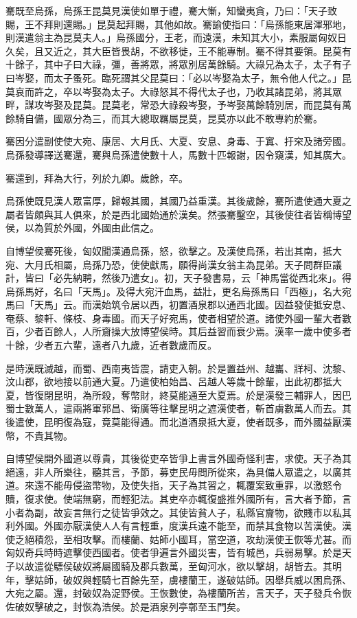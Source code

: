 \begin{pinyinscope}
騫既至烏孫，烏孫王昆莫見漢使如單于禮，騫大慚，知蠻夷貪，乃曰：「天子致賜，王不拜則還賜。」昆莫起拜賜，其他如故。騫諭使指曰：「烏孫能東居渾邪地，則漢遣翁主為昆莫夫人。」烏孫國分，王老，而遠漢，未知其大小，素服屬匈奴日久矣，且又近之，其大臣皆畏胡，不欲移徙，王不能專制。騫不得其要領。昆莫有十餘子，其中子曰大祿，彊，善將眾，將眾別居萬餘騎。大祿兄為太子，太子有子曰岑娶，而太子蚤死。臨死謂其父昆莫曰：「必以岑娶為太子，無令他人代之。」昆莫哀而許之，卒以岑娶為太子。大祿怒其不得代太子也，乃收其諸昆弟，將其眾畔，謀攻岑娶及昆莫。昆莫老，常恐大祿殺岑娶，予岑娶萬餘騎別居，而昆莫有萬餘騎自備，國眾分為三，而其大總取羈屬昆莫，昆莫亦以此不敢專約於騫。

騫因分遣副使使大宛、康居、大月氏、大夏、安息、身毒、于窴、扜穼及諸旁國。烏孫發導譯送騫還，騫與烏孫遣使數十人，馬數十匹報謝，因令窺漢，知其廣大。

騫還到，拜為大行，列於九卿。歲餘，卒。

烏孫使既見漢人眾富厚，歸報其國，其國乃益重漢。其後歲餘，騫所遣使通大夏之屬者皆頗與其人俱來，於是西北國始通於漢矣。然張騫鑿空，其後使往者皆稱博望侯，以為質於外國，外國由此信之。

自博望侯騫死後，匈奴聞漢通烏孫，怒，欲擊之。及漢使烏孫，若出其南，抵大宛、大月氏相屬，烏孫乃恐，使使獻馬，願得尚漢女翁主為昆弟。天子問群臣議計，皆曰「必先納聘，然後乃遣女」。初，天子發書易，云「神馬當從西北來」。得烏孫馬好，名曰「天馬」。及得大宛汗血馬，益壯，更名烏孫馬曰「西極」，名大宛馬曰「天馬」云。而漢始筑令居以西，初置酒泉郡以通西北國。因益發使抵安息、奄蔡、黎軒、條枝、身毒國。而天子好宛馬，使者相望於道。諸使外國一輩大者數百，少者百餘人，人所齎操大放博望侯時。其后益習而衰少焉。漢率一歲中使多者十餘，少者五六輩，遠者八九歲，近者數歲而反。

是時漢既滅越，而蜀、西南夷皆震，請吏入朝。於是置益州、越巂、牂柯、沈黎、汶山郡，欲地接以前通大夏。乃遣使柏始昌、呂越人等歲十餘輩，出此初郡抵大夏，皆復閉昆明，為所殺，奪幣財，終莫能通至大夏焉。於是漢發三輔罪人，因巴蜀士數萬人，遣兩將軍郭昌、衛廣等往擊昆明之遮漢使者，斬首虜數萬人而去。其後遣使，昆明復為寇，竟莫能得通。而北道酒泉抵大夏，使者既多，而外國益厭漢幣，不貴其物。

自博望侯開外國道以尊貴，其後從吏卒皆爭上書言外國奇怪利害，求使。天子為其絕遠，非人所樂往，聽其言，予節，募吏民毋問所從來，為具備人眾遣之，以廣其道。來還不能毋侵盜幣物，及使失指，天子為其習之，輒覆案致重罪，以激怒令贖，復求使。使端無窮，而輕犯法。其吏卒亦輒復盛推外國所有，言大者予節，言小者為副，故妄言無行之徒皆爭效之。其使皆貧人子，私縣官齎物，欲賤市以私其利外國。外國亦厭漢使人人有言輕重，度漢兵遠不能至，而禁其食物以苦漢使。漢使乏絕積怨，至相攻擊。而樓蘭、姑師小國耳，當空道，攻劫漢使王恢等尤甚。而匈奴奇兵時時遮擊使西國者。使者爭遍言外國災害，皆有城邑，兵弱易擊。於是天子以故遣從驃侯破奴將屬國騎及郡兵數萬，至匈河水，欲以擊胡，胡皆去。其明年，擊姑師，破奴與輕騎七百餘先至，虜樓蘭王，遂破姑師。因舉兵威以困烏孫、大宛之屬。還，封破奴為浞野侯。王恢數使，為樓蘭所苦，言天子，天子發兵令恢佐破奴擊破之，封恢為浩侯。於是酒泉列亭鄣至玉門矣。


\end{pinyinscope}
